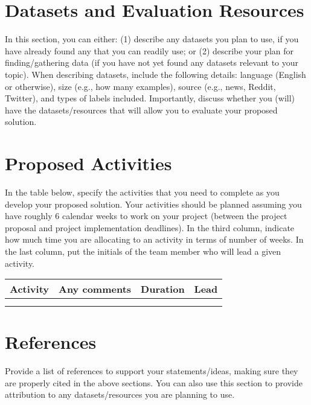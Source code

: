 \documentclass[11pt]{article}
\begin{document}
\section{Datasets and Evaluation Resources}
In this section, you can either: (1) describe any datasets you plan to use, if you have already found any that you can readily use; or (2) describe your plan for finding/gathering data (if you have not yet found any datasets relevant to your topic). When describing datasets, include the following details: language (English or otherwise), size (e.g., how many examples), source (e.g., news, Reddit, Twitter), and types of labels included. Importantly, discuss whether you (will) have the datasets/resources that will allow you to evaluate your proposed solution. 



\section{Proposed Activities}
In the table below, specify the activities that you need to complete as you develop your proposed solution. Your activities should be planned assuming you have roughly 6 calendar weeks to work on your project (between the project proposal and project implementation deadlines). In the third column, indicate how much time you are allocating to an activity in terms of number of weeks. In the last column, put the initials of the team member who will lead a given activity.

\begin{table}[h]
\centering
\begin{tabular}{|l|l|c|c|}
\hline
\textbf{Activity} & \textbf{Any comments} & \textbf{Duration} & \textbf{Lead}\\
\hline
& & & \\
\hline
& & & \\
\hline
\end{tabular}
\end{table}


\section*{References}
Provide a list of references to support your statements/ideas, making sure they are properly cited in the above sections. You can also use this section to provide attribution to any datasets/resources you are planning to use.


\end{document}
